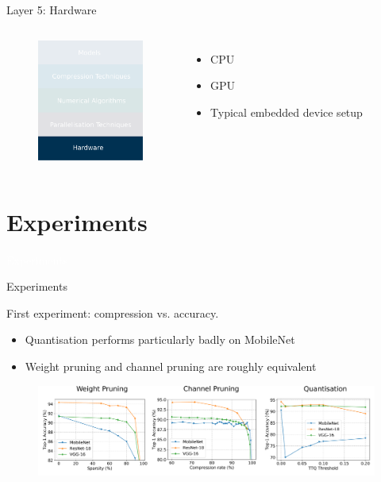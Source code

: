 \documentclass[xcolor=dvipsnames]{beamer}
\begin{document}
\begin{frame}{Layer 5: Hardware}

\begin{columns}


\begin{figure}
    \centering
    \includegraphics[width=3.5cm]{images/hardwares.pdf}
\end{figure}


\begin{itemize}
    \item CPU
    \item GPU
    \item Typical embedded device setup
\end{itemize}
\end{columns}


\end{frame}




\section{Experiments}

{
\begin{frame}
    \centering
    \textcolor{white}{\LARGE Experiments}
\end{frame}
}

\begin{frame}{Experiments}

First experiment: compression vs. accuracy.
\vspace{0.5cm}
\begin{itemize}
    \item Quantisation performs particularly badly on MobileNet
    \item Weight pruning and channel pruning are roughly equivalent 
\end{itemize}
    
\vspace{0.5cm}
\begin{figure}
    \centering
    \includegraphics[width=\linewidth]{images/accuracies.pdf}
\end{figure}
    
\end{frame}
\end{document}
